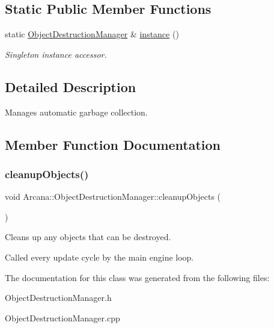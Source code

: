 \subsection*{Static Public Member Functions}
\begin{DoxyCompactItemize}
\item 
\mbox{\label{class_arcana_1_1_object_destruction_manager_a53d504581d3835324bb5fe5b5d487401}} 
static \mbox{\hyperlink{class_arcana_1_1_object_destruction_manager}{Object\+Destruction\+Manager}} \& \mbox{\hyperlink{class_arcana_1_1_object_destruction_manager_a53d504581d3835324bb5fe5b5d487401}{instance}} ()
\begin{DoxyCompactList}\small\item\em Singleton instance accessor. \end{DoxyCompactList}\end{DoxyCompactItemize}


\subsection{Detailed Description}
Manages automatic garbage collection. 

\subsection{Member Function Documentation}
\mbox{\label{class_arcana_1_1_object_destruction_manager_a662cd206b7da25f1f25d7aeab978740d}} 
\subsubsection{\texorpdfstring{cleanup\+Objects()}{cleanupObjects()}}
{\footnotesize\ttfamily void Arcana\+::\+Object\+Destruction\+Manager\+::cleanup\+Objects (\begin{DoxyParamCaption}{ }\end{DoxyParamCaption})}



Cleans up any objects that can be destroyed. 

Called every update cycle by the main engine loop. 

The documentation for this class was generated from the following files\+:\begin{DoxyCompactItemize}
\item 
Object\+Destruction\+Manager.\+h\item 
Object\+Destruction\+Manager.\+cpp\end{DoxyCompactItemize}
